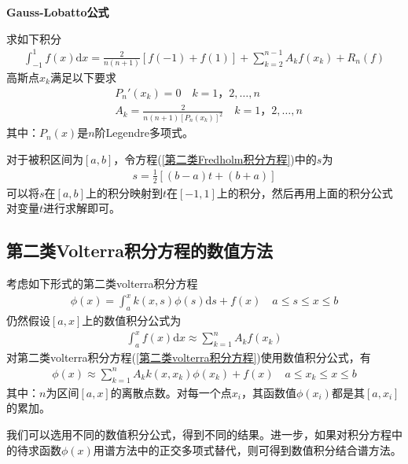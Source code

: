 			\textbf{Gauss-Lobatto公式}
			\par
			求如下积分
			\begin{align*}
				\int_{-1}^{1} f(x) \mathrm{d}x = \frac{2}{n(n+1)} [f(-1) + f(1)] + \sum_{k = 2}^{n-1} A_k f(x_k)+R_n(f)
			\end{align*}
			高斯点$x_k$满足以下要求
			\begin{align*}
				&P_n'(x_k) = 0 \quad k = 1，2,\dots,n\\
				&A_k = \frac{2}{n(n+1)[P_n(x_k)]^2} \quad k = 1，2,\dots,n
			\end{align*}
			其中：$P_n(x)$是$n$阶Legendre多项式。
			\par
			对于被积区间为$[a,b]$，令方程(\ref{第二类Fredholm积分方程})中的$s$为
			\begin{align*}
				s = \frac{1}{2} [(b-a)t +(b+a)]
			\end{align*}
			可以将$s$在$[a,b]$上的积分映射到$t$在$[-1,1]$上的积分，然后再用上面的积分公式对变量$t$进行求解即可。

	\subsection{第二类Volterra积分方程的数值方法}
		\label{subsec:第二类volterra积分方程的数值方法}
		\par
		考虑如下形式的第二类volterra积分方程
		\begin{align}
			\label{第二类volterra积分方程}
			\phi(x) = \int_{a}^{x} k(x,s) \phi(s)\mathrm{d}s + f(x) \quad a \leqslant s \leqslant x \leqslant b
		\end{align}
		仍然假设$[a,x]$上的数值积分公式为
		\begin{align*}
			 \int_a^x f(x) \mathrm{d}x \approx \sum_{k = 1}^n A_k f(x_k)
		\end{align*}
		对第二类volterra积分方程(\ref{第二类volterra积分方程})使用数值积分公式，有
		\begin{align*}
			\phi(x) \approx \sum_{k = 1}^n A_k k(x,x_k) \phi(x_k) + f(x) \quad a \leqslant x_k \leqslant x \leqslant b
		\end{align*}
		其中：$n$为区间$[a,x]$的离散点数。对每一个点$x_i$，其函数值$\phi(x_i)$都是其$[a,x_i]$的累加。
		\par
		我们可以选用不同的数值积分公式，得到不同的结果。进一步，如果对积分方程中的待求函数$\phi(x)$用谱方法中的正交多项式替代，则可得到数值积分结合谱方法。




% 
